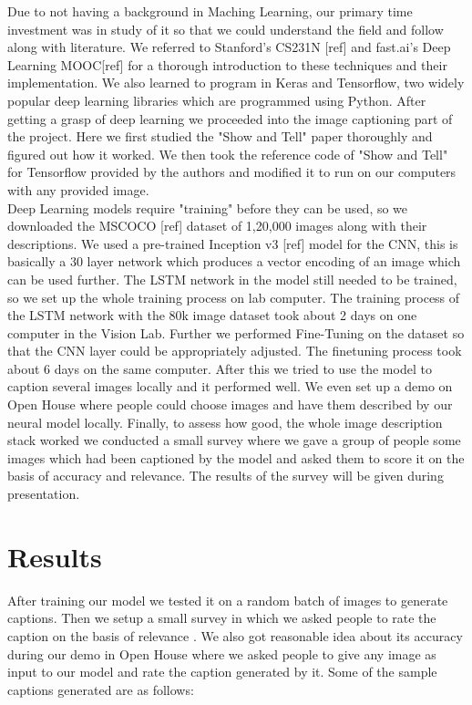 \documentclass[11pt]{article}
\begin{document}
Due to not having a background in Maching Learning, our primary time investment was in study of it so that we could understand the field and follow along with literature. We referred to Stanford's CS231N [ref] and fast.ai's Deep Learning MOOC[ref] for a thorough introduction to these techniques and their implementation. We also learned to program in Keras and Tensorflow, two widely popular deep learning libraries which are programmed using Python.  After getting a grasp of deep learning we proceeded into the image captioning part of the project. Here we first studied the "Show and Tell" paper thoroughly and figured out how it worked. We then took the reference code of "Show and Tell" for Tensorflow provided by the authors and modified it to run on our computers with any provided image.\\Deep Learning models require "training" before they can be used, so we downloaded the MSCOCO [ref] dataset of 1,20,000 images along with their descriptions. We used a pre-trained Inception v3 [ref] model for the CNN, this is basically a 30 layer network which produces a vector encoding of an image which can be used further. The LSTM network in the model still needed to be trained, so we set up the whole training process on lab computer. The training process of the LSTM network with the 80k image dataset took about 2 days on one computer in the Vision Lab. Further we performed Fine-Tuning on the dataset so that the CNN layer could be appropriately adjusted. The finetuning process took about 6 days on the same computer. After this we tried to use the model to caption several images locally and it performed well. We even set up a demo on Open House where people could choose images and have them described by our neural model locally. Finally, to assess how good, the whole image description stack worked we conducted a small survey where we gave a group of people some images which had been captioned by the model and asked them to score it on the basis of accuracy and relevance. The results of the survey will be given during presentation.


	\section{Results}
		After training our model we tested it on a random batch of images to generate captions. Then we setup a small survey in which we asked people to rate the caption on the basis of relevance . We also got reasonable idea about its accuracy during our demo in Open House where we asked people to give any image as input to our model and rate the caption generated by it. Some of the sample captions generated are as follows:
	\newpage
\end{document}
